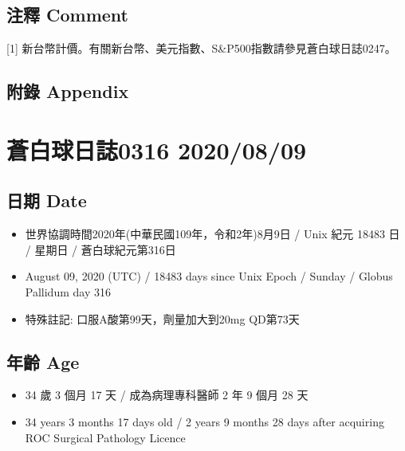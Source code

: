 \documentclass[
]{article}
\providecommand{\tightlist}{%
  \setlength{\itemsep}{0pt}\setlength{\parskip}{0pt}}
\begin{document}
\hypertarget{ux6ce8ux91cb-comment-7}{%
\subsection{注釋 Comment}\label{ux6ce8ux91cb-comment-7}}

{[}1{]}
新台幣計價。有關新台幣、美元指數、S\&P500指數請參見蒼白球日誌0247。

\hypertarget{ux9644ux9304-appendix-7}{%
\subsection{附錄 Appendix}\label{ux9644ux9304-appendix-7}}

\hypertarget{ux84bcux767dux7403ux65e5ux8a8c0316-20200809}{%
\section{蒼白球日誌0316
2020/08/09}\label{ux84bcux767dux7403ux65e5ux8a8c0316-20200809}}

\hypertarget{ux65e5ux671f-date-8}{%
\subsection{日期 Date}\label{ux65e5ux671f-date-8}}

\begin{itemize}
\tightlist
\item
  世界協調時間2020年(中華民國109年，令和2年)8月9日 / Unix 紀元 18483 日
  / 星期日 / 蒼白球紀元第316日
\item
  August 09, 2020 (UTC) / 18483 days since Unix Epoch / Sunday / Globus
  Pallidum day 316
\item
  特殊註記: 口服A酸第99天，劑量加大到20mg QD第73天
\end{itemize}

\hypertarget{ux5e74ux9f61-age-8}{%
\subsection{年齡 Age}\label{ux5e74ux9f61-age-8}}

\begin{itemize}
\tightlist
\item
  34 歲 3 個月 17 天 / 成為病理專科醫師 2 年 9 個月 28 天
\item
  34 years 3 months 17 days old / 2 years 9 months 28 days after
  acquiring ROC Surgical Pathology Licence
\end{itemize}
\end{document}
